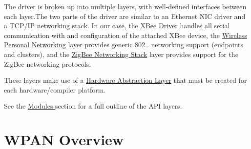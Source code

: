 The driver is broken up into multiple layers, with well-\/defined interfaces between each layer.\-The two parts of the driver are similar to an Ethernet N\-I\-C driver and a T\-C\-P/\-I\-P networking stack. In our case, the \hyperlink{group__xbee}{X\-Bee Driver} handles all serial communication with and configuration of the attached X\-Bee device, the \hyperlink{group__wpan}{Wireless Personal Networking} layer provides generic 802.. networking support (endpoints and clusters), and the \hyperlink{group__zigbee}{Zig\-Bee Networking Stack} layer provides support for the Zig\-Bee networking protocols.

These layers make use of a \hyperlink{group__hal}{Hardware Abstraction Layer} that must be created for each hardware/compiler platform.

See the \hyperlink{}{Modules } section for a full outline of the A\-P\-I layers.\hypertarget{index_wpan_overview}{}\section{W\-P\-A\-N Overview}\label{index_wpan_overview}
